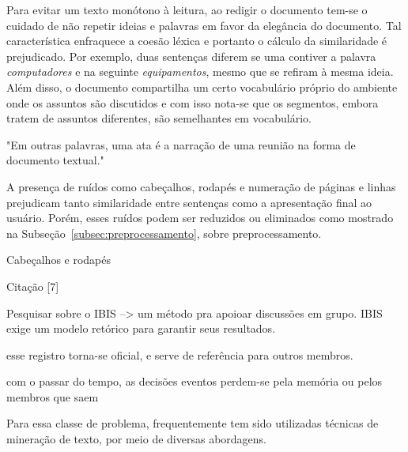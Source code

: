 Para evitar um texto monótono à leitura, ao redigir o documento tem-se o cuidado de não repetir ideias e palavras em favor da elegância do documento. Tal característica enfraquece a coesão léxica e portanto o cálculo da similaridade é prejudicado. Por exemplo, duas sentenças diferem se uma contiver a palavra \textit{computadores} e na seguinte \textit{equipamentos}, mesmo que se refiram à mesma ideia. Além disso, o documento compartilha um certo vocabulário próprio do ambiente onde os assuntos são discutidos e com isso nota-se que os segmentos, embora tratem de assuntos diferentes, são semelhantes em vocabulário.


"Em outras palavras, uma ata é a narração de uma reunião na forma de documento textual."

A presença de ruídos como cabeçalhos, rodapés e numeração de páginas e linhas prejudicam tanto similaridade entre sentenças como a apresentação final ao usuário. Porém, esses ruídos podem ser reduzidos ou eliminados como mostrado na Subseção~\ref{subsec:preprocessamento}, sobre preprocessamento.


  Cabeçalhos e rodapés







Citação [7]

Pesquisar sobre o IBIS --> um método pra apoioar discussões em grupo.
IBIS exige um modelo retórico para garantir seus resultados.

 esse registro torna-se oficial, e serve de referência para outros membros. 

 com o passar do tempo, as decisões eventos perdem-se pela memória ou pelos membros que saem



Para essa classe de problema, frequentemente tem sido utilizadas técnicas de mineração de texto, por meio de diversas abordagens.  


